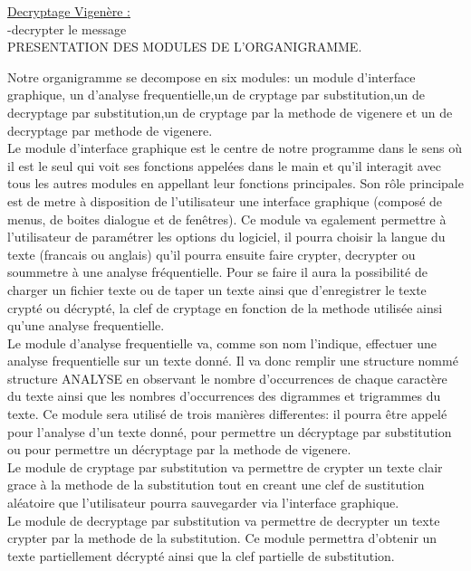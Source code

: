 \documentclass[a4]{article}
\begin{document}
			\underline{Decryptage Vigenère :}\\
			-decrypter le message\\
			
			



PRESENTATION DES MODULES DE L'ORGANIGRAMME.

	Notre organigramme se decompose en six modules:  un module d'interface graphique, un d'analyse 
	frequentielle,un de cryptage par substitution,un de decryptage par substitution,un de cryptage 
	par la methode de vigenere et un de decryptage par methode de vigenere. \\

	Le module d'interface graphique est le centre de notre programme dans le sens où il est le seul qui voit ses 
	fonctions appelées dans le main et qu'il interagit avec tous les autres modules en appellant leur fonctions principales.
	Son rôle principale est de metre à disposition de l'utilisateur une interface graphique 
	(composé de menus, de boites dialogue et de fenêtres). Ce module va egalement permettre à l'utilisateur de
	 paramétrer les options du logiciel, il pourra choisir la langue du texte (francais ou anglais) qu'il
	  pourra ensuite faire crypter, decrypter ou soummetre à une analyse fréquentielle. Pour se faire il aura
	   la possibilité de charger un fichier texte ou de taper un texte ainsi que d'enregistrer le texte crypté 
	   ou décrypté, la clef de cryptage en fonction de la methode utilisée ainsi qu'une analyse frequentielle. \\
	
	Le module d'analyse frequentielle va, comme son nom l'indique, effectuer une analyse frequentielle sur un texte donné.
	 Il va donc remplir une structure nommé structure ANALYSE en observant le nombre d'occurrences de chaque caractère du 
	 texte ainsi que les nombres d'occurrences des digrammes et trigrammes du texte.
	Ce module sera utilisé de trois manières differentes: il pourra être appelé pour l'analyse d'un texte donné,
	 pour permettre un décryptage par substitution ou pour permettre un décryptage par la methode de vigenere. \\

	Le module de cryptage par substitution va permettre de crypter un texte clair grace à la methode de la substitution
	 tout en creant une clef de sustitution aléatoire que l'utilisateur pourra sauvegarder via l'interface graphique. \\
	
	Le module de decryptage par substitution va permettre de decrypter un texte crypter par la methode de la substitution.
	 Ce module permettra d'obtenir un texte partiellement décrypté ainsi que la clef partielle de substitution. \\
\end{document}
